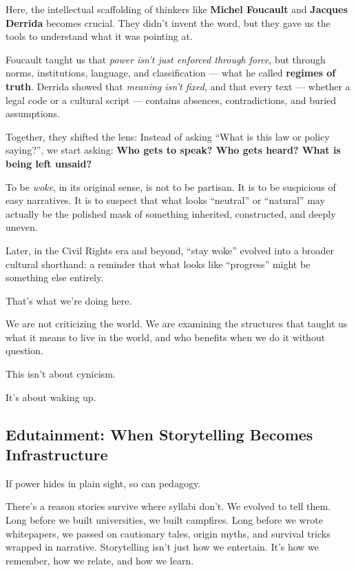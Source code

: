 \medskip

Here, the intellectual scaffolding of thinkers like \textbf{Michel Foucault} and \textbf{Jacques Derrida} becomes crucial.  
They didn’t invent the word, but they gave us the tools to understand what it was pointing at.

Foucault taught us that \textit{power isn’t just enforced through force}, but through norms, institutions, language, and classification — what he called \textbf{regimes of truth}.  
Derrida showed that \textit{meaning isn’t fixed}, and that every text — whether a legal code or a cultural script — contains absences, contradictions, and buried assumptions.

Together, they shifted the lens:  
Instead of asking ``What is this law or policy saying?'', we start asking:  
\textbf{Who gets to speak? Who gets heard? What is being left unsaid?}

To be \textit{woke}, in its original sense, is not to be partisan.  
It is to be suspicious of easy narratives.  
It is to suspect that what looks ``neutral'' or ``natural'' may actually be the polished mask of something inherited, 
constructed, and deeply uneven.

Later, in the Civil Rights era and beyond, ``stay woke'' evolved into a broader cultural shorthand:  
a reminder that what looks like ``progress'' might be something else entirely.

That’s what we’re doing here.

We are not criticizing the world. We are examining the structures that taught us what it means to live in the world, 
and who benefits when we do it without question.

This isn’t about cynicism.

It’s about waking up.


\subsection{Edutainment: When Storytelling Becomes Infrastructure}

If power hides in plain sight, so can pedagogy.

There’s a reason stories survive where syllabi don’t.
We evolved to tell them. Long before we built universities, we built campfires.
Long before we wrote whitepapers, we passed on cautionary tales, origin myths, and survival tricks wrapped in narrative.
Storytelling isn’t just how we entertain. It’s how we remember, how we relate, and how we learn.

